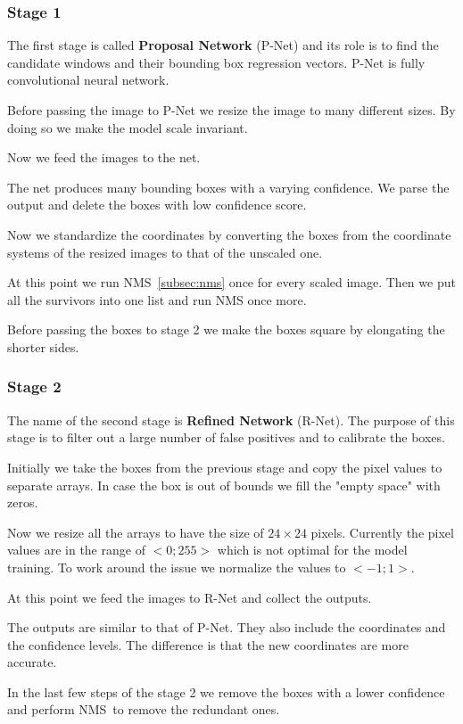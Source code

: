 \subsubsection{Stage 1}
The first stage is called \textbf{Proposal Network} (P-Net) and its role is to find the candidate windows and their
bounding box regression vectors.
P-Net is fully convolutional neural network.

Before passing the image to P-Net we resize the image to many different sizes.
By doing so we make the model scale invariant.

Now we feed the images to the net.

The net produces many bounding boxes with a varying confidence.
We parse the output and delete the boxes with low confidence score.

Now we standardize the coordinates by converting the boxes from the coordinate systems of the resized images to
that of the unscaled one.

At this point we run NMS~\ref{subsec:nms} once for every scaled image.
Then we put all the survivors into one list and run NMS once more.

Before passing the boxes to stage 2 we make the boxes square by elongating the shorter sides.

\subsubsection{Stage 2}
The name of the second stage is \textbf{Refined Network} (R-Net).
The purpose of this stage is to filter out a large number of false positives and to calibrate the boxes.

Initially we take the boxes from the previous stage and copy the pixel values to separate arrays.
In case the box is out of bounds we fill the "empty space" with zeros.

Now we resize all the arrays to have the size of $24 \times 24$ pixels.
Currently the pixel values are in the range of $<0; 255>$ which is not optimal for the model training.
To work around the issue we normalize the values to $<-1; 1>$.

At this point we feed the images to R-Net and collect the outputs.

The outputs are similar to that of P-Net.
They also include the coordinates and the confidence levels.
The difference is that the new coordinates are more accurate.

In the last few steps of the stage 2 we remove the boxes with a lower confidence and perform NMS to remove the
redundant ones.

